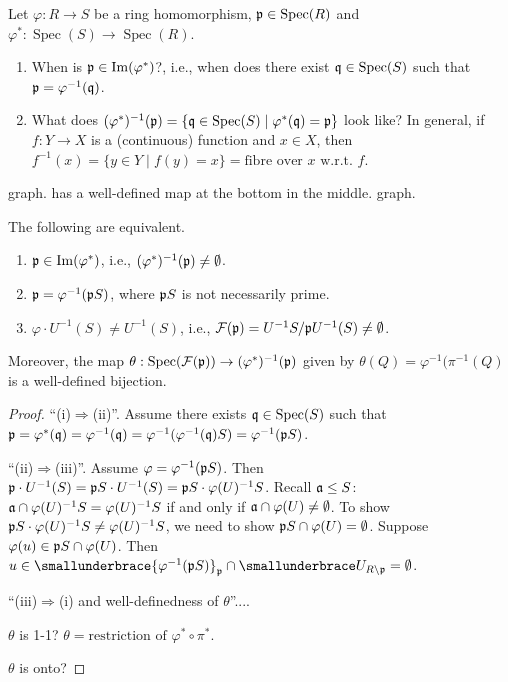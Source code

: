\begin{question}
    Let $\varphi: R \to S$ be a ring homomorphism, $\mathfrak{p} \in \operatorname{Spec}(R)$ and $\varphi^*: \operatorname{Spec}(S) \to \operatorname{Spec}(R)$.
    \begin{enumerate}
        \item When is $\mathfrak{p} \in \operatorname{Im}(\varphi^*)$?, i.e., when does there exist $\mathfrak{q} \in \operatorname{Spec}(S)$ such that $\mathfrak{p}  = \varphi^{-1}(\mathfrak{q})$.
        \item What does $(\varphi^*)^{-1}(\mathfrak{p}) = \{\mathfrak{q} \in \operatorname{Spec}(S) \mid \varphi^*(\mathfrak{q}) = \mathfrak{p}\}$ look like? In general, if $f: Y \to X$ is a (continuous) function and $x \in X$, then $f^{-1}(x) = \{y \in Y \mid f(y) = x\} = \text{fibre over $x$ w.r.t. $f$}$.
    \end{enumerate}
\end{question}

\begin{construction}
    graph. has a well-defined map at the bottom in the middle.
    graph.
\end{construction}

\begin{theorem}
    The following are equivalent.
    \begin{enumerate}
        \item $\mathfrak{p} \in \operatorname{Im}(\varphi^*)$, i.e., $(\varphi^*)^{-1}(\mathfrak{p}) \neq \emptyset$.
        \item $\mathfrak{p} = \varphi^{-1}(\mathfrak{p} S)$, where $\mathfrak{p} S$ is not necessarily prime.
        \item $\varphi \cdot U^{-1}(S) \neq U^{-1}(S)$, i.e., $\mathcal{F}(\mathfrak{p}) = U^{-1}S/\mathfrak{p} U^{-1}(S) \neq \emptyset$.
    \end{enumerate}
    Moreover, the map $\theta: \operatorname{Spec}(\mathcal{F}(\mathfrak{p})) \to (\varphi^*)^{-1}(\mathfrak{p})$ given by $\theta(Q) = \varphi^{-1}(\pi^{-1}(Q)$ is a well-defined bijection.
\end{theorem}

\begin{proof}
    ``(i)$\Rightarrow$(ii)''. Assume there exists $\mathfrak{q} \in \operatorname{Spec}(S)$ such that $\mathfrak{p} = \varphi^*(\mathfrak{q}) = \varphi^{-1}(\mathfrak{q}) = \varphi^{-1}(\varphi^{-1}(\mathfrak{q})S) = \varphi^{-1}(\mathfrak{p} S)$. \par 
    ``(ii)$\Rightarrow$(iii)''. Assume $\varphi = \varphi^{-1}(\mathfrak{p} S)$. Then $\mathfrak{p} \cdot U^{-1}(S) = \mathfrak{p} S \cdot U^{-1}(S) = \mathfrak{p} S \cdot \varphi(U)^{-1}S$. Recall $\mathfrak{a} \leq S$: $\mathfrak{a} \cap \varphi(U)^{-1}S = \varphi(U)^{-1}S$ if and only if $\mathfrak{a} \cap \varphi(U) \neq \emptyset$. To show $\mathfrak{p} S \cdot \varphi(U)^{-1}S \neq \varphi(U)^{-1}S$, we need to show $\mathfrak{p} S \cap \varphi(U) = \emptyset$. Suppose $\varphi(u) \in \mathfrak{p} S \cap \varphi(U)$. Then $u \in \smallunderbrace{\varphi^{-1}(\ffp S)}_{\ffp} \cap \smallunderbrace U_{R \setminus \ffp} = \emptyset$. \par 
    ``(iii)$\Rightarrow$(i) and well-definedness of $\theta$''.... \par 
    $\theta$ is 1-1? $\theta = \text{restriction of $\varphi^* \circ \pi^{*}$}$. \par 
    $\theta$ is onto?
\end{proof}

